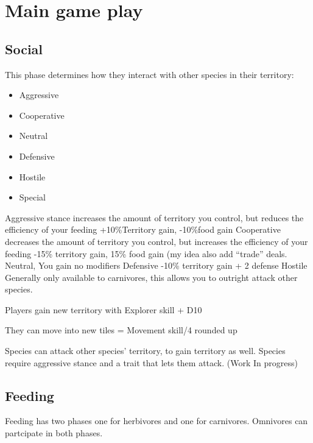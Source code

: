 \chapter{Main game play}
\label{ch:gameplay}
%
%

\section{Social}
\label{sec:gameplay:Social}

This phase determines how they interact with other species in their territory:

\begin{itemize}
	\item Aggressive
	\item Cooperative
	\item Neutral 
	\item Defensive
	\item Hostile
	\item Special
\end{itemize}

Aggressive stance increases the amount of territory you control, but reduces the efficiency of your feeding +10\%Territory gain, -10\%food gain\newline
Cooperative decreases the amount of territory you control, but increases the efficiency of your feeding -15\% territory gain, 15\% food gain (my idea also add "`trade"' deals.\newline
Neutral, You gain no modifiers\newline
Defensive  -10\% territory gain + 2 defense\newline
Hostile Generally only available to carnivores, this allows you to outright attack other species.\newline

Players gain new territory with  Explorer skill + D10

They can move into new tiles = Movement skill/4 rounded up

Species can attack other species' territory, to gain territory as well.  Species require aggressive stance and a trait that lets them attack. (Work In progress)

\section{Feeding}
\label{sec:gameplay:Feeding}

Feeding has two phases one for herbivores and one for carnivores.
Omnivores can partcipate in both phases.

